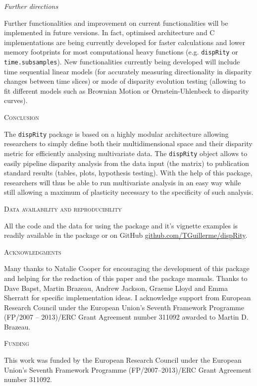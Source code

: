 \documentclass[12pt,letterpaper]{article}
\renewcommand{\section}[1]{%
\bigskip
\begin{center}
\begin{Large}
\normalfont\scshape #1
\medskip
\end{Large}
\end{center}}
\renewcommand{\subsection}[1]{%
\bigskip
\begin{center}
\begin{large}
\normalfont\itshape #1
\end{large}
\end{center}}
\newcommand{\disp}{\texttt{dispRity} }
\begin{document}
\subsection{Further directions}
Further functionalities and improvement on current functionalities will be implemented in future versions.
In fact, optimised architecture and C implementations are being currently developed for faster calculations and lower memory footprints for most computational heavy functions (e.g. \disp or \texttt{time.subsamples}).
New functionalities currently being developed will include time sequential linear models (for accurately measuring directionality in disparity changes between time slices) or mode of disparity evolution testing (allowing to fit different models such as Brownian Motion or Ornstein-Uhlenbeck to disparity curves).



\section{Conclusion}
The \disp package is based on a highly modular architecture allowing researchers to simply define both their multidimensional space and their disparity metric for efficiently analysing multivariate data.
The \disp object allows to easily pipeline disparity analysis from the data input (the matrix) to publication standard results (tables, plots, hypothesis testing).
With the help of this package, researchers will thus be able to run multivariate analysis in an easy way while still allowing a maximum of plasticity necessary to the specificity of such analysis.


\section{Data availability and reproducibility}
All the code and the data for using the package and it's vignette examples is readily available in the package or on GitHub \url{github.com/TGuillerme/dispRity}.

\section{Acknowledgments}
Many thanks to Natalie Cooper for encouraging the development of this package and helping for the redaction of this paper and the package manuals.
Thanks to Dave Bapst, Martin Brazeau, Andrew Jackson, Graeme Lloyd and Emma Sherratt for specific implementation ideas.
I acknowledge support from European Research Council under the European Union's Seventh Framework Programme (FP/2007 – 2013)/ERC Grant Agreement number 311092 awarded to Martin D. Brazeau.

\section{Funding}
This work was funded by the European Research Council under the European Union's Seventh Framework Programme (FP/2007–2013)/ERC Grant Agreement number 311092.



\end{document}
